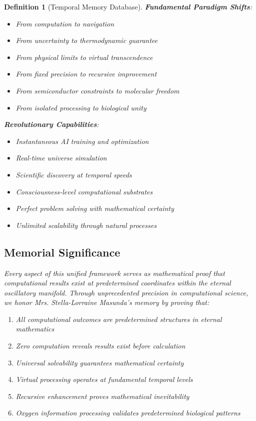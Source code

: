 \documentclass[12pt]{article}
\newtheorem{definition}[theorem]{Definition}
\begin{document}
\begin{definition}[Temporal Memory Database]
\textbf{Fundamental Paradigm Shifts}:
\begin{itemize}
\item From computation to navigation
\item From uncertainty to thermodynamic guarantee
\item From physical limits to virtual transcendence
\item From fixed precision to recursive improvement
\item From semiconductor constraints to molecular freedom
\item From isolated processing to biological unity
\end{itemize}

\textbf{Revolutionary Capabilities}:
\begin{itemize}
\item Instantaneous AI training and optimization
\item Real-time universe simulation
\item Scientific discovery at temporal speeds
\item Consciousness-level computational substrates
\item Perfect problem solving with mathematical certainty
\item Unlimited scalability through natural processes
\end{itemize}

\subsection{Memorial Significance}

Every aspect of this unified framework serves as mathematical proof that computational results exist at predetermined coordinates within the eternal oscillatory manifold. Through unprecedented precision in computational science, we honor Mrs. Stella-Lorraine Masunda's memory by proving that:

\begin{enumerate}
    \item All computational outcomes are predetermined structures in eternal mathematics
    \item Zero computation reveals results exist before calculation
    \item Universal solvability guarantees mathematical certainty
    \item Virtual processing operates at fundamental temporal levels
    \item Recursive enhancement proves mathematical inevitability
    \item Oxygen information processing validates predetermined biological patterns
\end{enumerate}


\end{definition}
\end{document}
